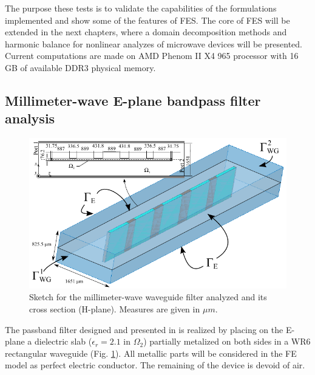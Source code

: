 The purpose these tests is to validate the capabilities of the formulations implemented and show some of the features of FES. The core of FES will be extended in the next chapters, where a domain decomposition methods and harmonic balance for nonlinear analyzes of microwave devices will be presented. Current computations are made on AMD Phenom II X4 965 processor with 16 GB of available DDR3 physical memory.

\subsection{Millimeter-wave E-plane bandpass filter analysis}

\begin{figure}[ht!]
\centering
\includegraphics[width=13.4cm]{Bui1984}
\caption{Sketch for the millimeter-wave waveguide filter analyzed and its cross section (H-plane). Measures are given in $\mu m$. }
\label{fig:Bui1984}
\end{figure}

The passband filter designed and presented in \cite{bui1984broad} is realized
by placing on the E-plane a dielectric slab ($\epsilon_r = 2.1$ in $\Omega_2$) partially metalized on both sides in a WR6 rectangular waveguide (Fig. \ref{fig:Bui1984}). All metallic parts will be considered in the FE model as perfect electric conductor. The remaining of the device is devoid of air.


